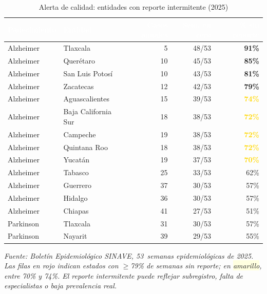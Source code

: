 \documentclass[12pt, letterpaper]{article}
\begin{document}
\begin{table}[H]
\centering
\caption{Alerta de calidad: entidades con reporte intermitente (2025)}
\label{tab:alerta_ceros}
\small
\renewcommand{\arraystretch}{1.15}
\begin{tabularx}{\textwidth}{l X r r r}
\toprule
\rowcolor{teal!90} \textcolor{white}{\textbf{Padecimiento}} & \textcolor{white}{\textbf{Entidad}} & \textcolor{white}{\textbf{Casos anuales}} & \textcolor{white}{\textbf{Sem. en cero}} & \textcolor{white}{\textbf{\% sin reporte}} \\
\midrule
\rowcolor{lightred} Alzheimer & Tlaxcala          &   5 & 48/53 & \textbf{\textcolor{burgundy}{91\%}} \\
\rowcolor{lightred} Alzheimer & Querétaro         &  10 & 45/53 & \textbf{\textcolor{burgundy}{85\%}} \\
\rowcolor{lightred} Alzheimer & San Luis Potosí   &  10 & 43/53 & \textbf{\textcolor{burgundy}{81\%}} \\
\rowcolor{lightred} Alzheimer & Zacatecas         &  12 & 42/53 & \textbf{\textcolor{burgundy}{79\%}} \\
\rowcolor{lightyellow} Alzheimer & Aguascalientes  &  15 & 39/53 & \textbf{\textcolor{gold}{74\%}} \\
\rowcolor{lightyellow} Alzheimer & Baja California Sur & 18 & 38/53 & \textbf{\textcolor{gold}{72\%}} \\
\rowcolor{lightyellow} Alzheimer & Campeche        &  19 & 38/53 & \textbf{\textcolor{gold}{72\%}} \\
\rowcolor{lightyellow} Alzheimer & Quintana Roo    &  18 & 38/53 & \textbf{\textcolor{gold}{72\%}} \\
\rowcolor{lightyellow} Alzheimer & Yucatán         &  19 & 37/53 & \textbf{\textcolor{gold}{70\%}} \\
Alzheimer & Tabasco            &  25 & 33/53 & 62\% \\
Alzheimer & Guerrero           &  37 & 30/53 & 57\% \\
Alzheimer & Hidalgo            &  36 & 30/53 & 57\% \\
Alzheimer & Chiapas            &  41 & 27/53 & 51\% \\
\midrule
Parkinson & Tlaxcala           &  31 & 30/53 & 57\% \\
Parkinson & Nayarit            &  39 & 29/53 & 55\% \\
\bottomrule
\end{tabularx}
\vspace{0.2cm}
\begin{flushleft}
\footnotesize\textit{Fuente: Boletín Epidemiológico SINAVE, 53~semanas epidemiológicas de 2025.
Las filas en \colorbox{lightred}{\scriptsize rojo} indican estados con $\geq$79\% de semanas sin reporte;
en \colorbox{lightyellow}{\scriptsize amarillo}, entre 70\% y 74\%.
El reporte intermitente puede reflejar subregistro, falta de especialistas o baja prevalencia real.}
\end{flushleft}
\end{table}
\end{document}
